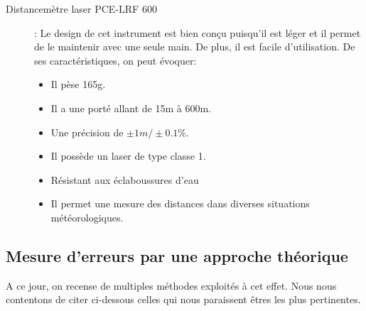 \documentclass[a4paper, 12pt]{book}
\begin{document}
\begin{description}
	\item[Distancemètre laser PCE-LRF 600]: Le design de cet instrument est bien conçu puisqu'il est léger et il permet de le maintenir avec une seule main. De plus, il est facile d'utilisation. De ses caractéristiques, on peut évoquer:
	\begin{itemize}
		\item Il pèse 165g.
		\item Il a une porté allant de 15m à 600m.
		\item Une précision de $\pm 1m/\pm 0.1\%$.
		\item Il possède un laser de type classe 1.
		\item Résistant aux éclaboussures d'eau
		\item Il permet une mesure des distances dans diverses situations météorologiques.
	\end{itemize}
	
\end{description}


\subsection{Mesure d'erreurs par une approche théorique}
A ce jour, on recense de multiples méthodes exploités à cet effet. Nous nous contentons de citer ci-dessous celles qui nous paraissent êtres les plus pertinentes. \\
\end{document}
